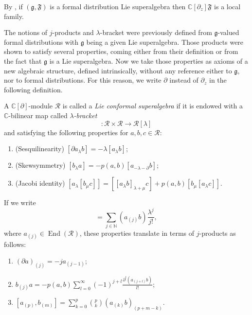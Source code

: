 \documentclass[a4paper, 12pt, reqno]{amsart}
\theoremstyle{remark}
\numberwithin{equation}{subsection}
\DeclareMathOperator{\End}{End}
\begin{document}
By , if $(\mathfrak{g}, \mathfrak{F})$ is a formal distribution Lie superalgebra then $\mathbb{C}[\partial_z]\mathfrak{F}$ is a local family.

The notions of $j$-products and $\lambda$-bracket were previously defined from $\mathfrak{g}$-valued formal distributions with $\mathfrak{g}$ being a given Lie superalgebra.
Those products were shown to satisfy several properties, coming either from their definition or from the fact that $\mathfrak{g}$ is a Lie superalgebra.
Now we take those properties as axioms of a new algebraic structure, defined intrinsically, without any reference either to $\mathfrak{g}$, nor to formal distributions.
For this reason, we write $\partial$ instead of $\partial_z$ in the following definition.

A $\mathbb{C}[\partial]$-module $\mathcal{R}$ is called a \emph{Lie conformal superalgebra} if it is endowed with a $\mathbb{C}$-bilinear map called \emph{$\lambda$-bracket}
\begin{equation*}
  [\bullet_{\lambda}\bullet]: \mathcal{R}\times\mathcal{R} \to \mathcal{R}[\lambda]
\end{equation*}
and satisfying the following properties for $a, b, c \in \mathcal{R}$:
\begin{enumerate}
\item (Sesquilinearity) $[\partial a_{\lambda}b] = -\lambda[a_{\lambda}b]$;
\item (Skewsymmetry) $[b_{\lambda}a] = -p(a, b)[a_{-\lambda - \partial}b]$;
\item (Jacobi identity) $[a_{\lambda}[b_{\mu}c]] = [[a_{\lambda}b]_{\lambda +\mu}c] + p(a, b)[b_{\mu}[a_{\lambda}c]]$.
\end{enumerate}

If we write
\begin{equation*}
  [a_{\lambda}b] = \sum_{j \in \mathbb{N}}(a_{(j)}b)\frac{\lambda^j}{j!},
\end{equation*}
where $a_{(j)} \in \End(\mathcal{R})$, these properties translate in terms of $j$-products as follows:
\begin{enumerate}
\item $(\partial a)_{(j)} = -ja_{(j - 1)}$;
\item $b_{(j)}a = -p(a, b)\sum_{l = 0}^{\infty}(-1)^{j + l}\frac{\partial^l(a_{(j + l)}b)}{l!}$;
\item $[a_{(p)}, b_{(m)}] = \sum_{k = 0}^p\binom{p}{k}(a_{(k)}b)_{(p + m - k)}$.
\end{enumerate}
\end{document}
